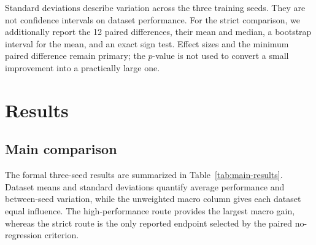 \documentclass[final,5p,times]{elsarticle}
\newcommand{\tabref}[1]{\textcolor{floatreviewblue}{Table~\ref{#1}}}
\newcommand{\tabref}[1]{Table~\ref{#1}}
\begin{document}
Standard deviations describe variation across the three training seeds. They
are not confidence intervals on dataset performance. For the strict
comparison, we additionally report the 12 paired differences, their mean and
median, a bootstrap interval for the mean, and an exact sign test. Effect
sizes and the minimum paired difference remain primary; the $p$-value is not
used to convert a small improvement into a practically large one.

\section{Results}
\label{sec:results}

\subsection{Main comparison}

The formal three-seed results are summarized in
\tabref{tab:main-results}. Dataset means and standard deviations quantify
average performance and between-seed variation, while the unweighted macro
column gives each dataset equal influence. The high-performance route provides
the largest macro gain, whereas the strict route is the only reported endpoint
selected by the paired no-regression criterion.
\end{document}
